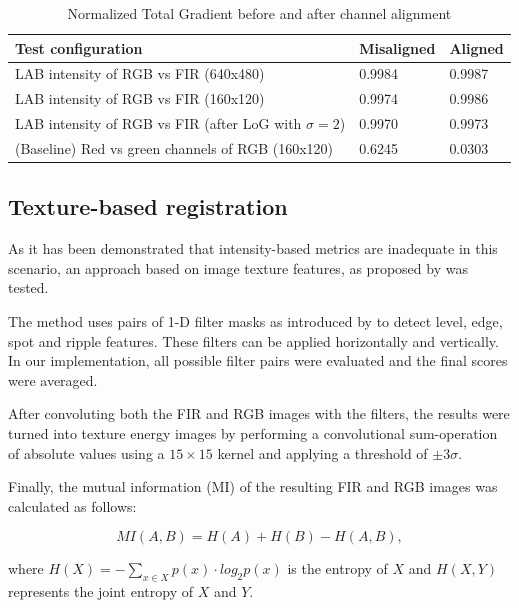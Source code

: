 \documentclass{l4proj}
\begin{document}
\begin{table}[]
  \centering
  \begin{tabular}{@{}lll@{}}
  \toprule
  \textbf{Test configuration}                             & \textbf{Misaligned} & \textbf{Aligned} \\ \midrule
  LAB intensity of RGB vs FIR (640x480)     & 0.9984              & 0.9987           \\
  LAB intensity of RGB vs FIR (160x120)    & 0.9974              & 0.9986           \\
  LAB intensity of RGB vs FIR (after LoG with $\sigma=2$) & 0.9970              & 0.9973           \\
  (Baseline) Red vs green channels of RGB (160x120)                  & 0.6245              & 0.0303           \\ \bottomrule
  \end{tabular}
  \caption{Normalized Total Gradient before and after channel alignment}
  \label{table:registration_ntg}
\end{table}


\subsection{Texture-based registration}

As it has been demonstrated that intensity-based metrics are inadequate in this scenario, an approach based on image texture features, as proposed by \citet{jarc_graz_nodate} was tested. 

The method uses pairs of 1-D filter masks as introduced by \citet{laws_rapid_1980} to detect level, edge, spot and ripple features. These filters can be applied horizontally and vertically. In our implementation, all possible filter pairs were evaluated and the final scores were averaged.

After convoluting both the FIR and RGB images with the filters, the results were turned into texture energy images by performing a convolutional sum-operation of absolute values using a $15 \times 15$ kernel and applying a threshold of $\pm 3 \sigma$. 

Finally, the mutual information (MI) of the resulting FIR and RGB images was calculated as follows:

\begin{equation}
  MI(A,B) = H(A) + H(B) - H(A,B),
\end{equation}

where $H(X) = - \sum_{x \in X} p(x) \cdot log_2 p(x)$ is the entropy of $X$ and $H(X,Y)$ represents the joint entropy of $X$ and $Y$.
\end{document}
